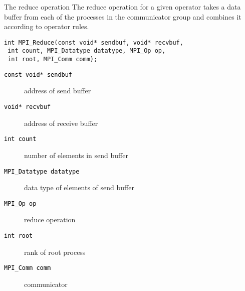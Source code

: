 \documentclass[xcolor={svgnames,usenames}]{beamer}
\begin{document}
\begin{frame}[fragile]{The reduce operation}
The reduce operation for a given operator takes a data buffer from each of the processes in the communicator group and combines it according to operator rules.
\begin{verbatim}
int MPI_Reduce(const void* sendbuf, void* recvbuf, 
 int count, MPI_Datatype datatype, MPI_Op op, 
 int root, MPI_Comm comm);
\end{verbatim}
\begin{description}
\item[\textcolor{black}{\texttt{const void* sendbuf}}] address of send buffer
\item[\textcolor{black}{\texttt{void* recvbuf}}] address of receive buffer
\item[\textcolor{black}{\texttt{int count}}] number of elements in send buffer
\item[\textcolor{black}{\texttt{MPI_Datatype datatype}}] data type of elements of send buffer
\item[\textcolor{black}{\texttt{MPI_Op op}}] reduce operation
\item[\textcolor{black}{\texttt{int root}}] rank of root process
\item[\textcolor{black}{\texttt{MPI_Comm comm}}] communicator
\end{description}
\end{frame}
\end{document}

